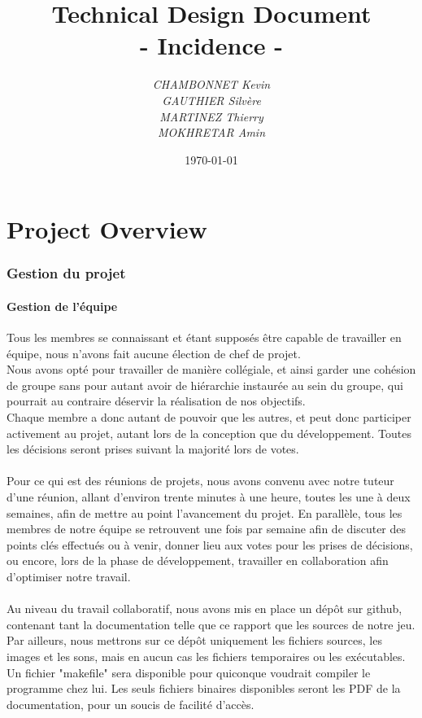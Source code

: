 \documentclass[a4paper]{article}
\title{\textbf{Technical Design Document}\\- \Huge{Incidence} -}
\author{\emph{CHAMBONNET Kevin}\\\emph{GAUTHIER Silvère}\\\emph{MARTINEZ Thierry}\\\emph{MOKHRETAR Amin}}
\date{\today}
\newcommand{\alinea}{\hspace*{0.5cm}}
\begin{document}
  \maketitle
  \newpage
  \tableofcontents


  \newpage
  \part{Project Overview}
    \section{Gestion du projet}
      \subsection{Gestion de l'équipe}
        \alinea Tous les membres se connaissant et étant supposés être capable de travailler en équipe, nous n'avons fait aucune élection de chef de projet.\\
        \alinea Nous avons opté pour travailler de manière collégiale, et ainsi garder une cohésion de groupe sans pour autant avoir de hiérarchie instaurée au sein du groupe, qui pourrait au contraire déservir la réalisation de nos objectifs.\\
        \alinea Chaque membre a donc autant de pouvoir que les autres, et peut donc participer activement au projet, autant lors de la conception que du développement. Toutes les décisions seront prises suivant la majorité lors de votes.\\\\
        \alinea Pour ce qui est des réunions de projets, nous avons convenu avec notre tuteur d'une réunion, allant d'environ trente minutes à une heure, toutes les une à deux semaines, afin de mettre au point l'avancement du projet. En parallèle, tous les membres de notre équipe se retrouvent une fois par semaine afin de discuter des points clés effectués ou à venir, donner lieu aux votes pour les prises de décisions, ou encore, lors de la phase de développement, travailler en collaboration afin d'optimiser notre travail.\\\\
        \alinea Au niveau du travail collaboratif, nous avons mis en place un dépôt sur github, contenant tant la documentation telle que ce rapport que les sources de notre jeu. Par ailleurs, nous mettrons sur ce dépôt uniquement les fichiers sources, les images et les sons, mais en aucun cas les fichiers temporaires ou les exécutables. Un fichier "makefile" sera disponible pour quiconque voudrait compiler le programme chez lui. Les seuls fichiers binaires disponibles seront les PDF de la documentation, pour un soucis de facilité d'accès.
\end{document}
